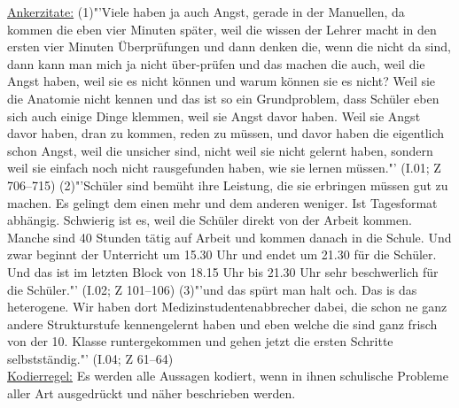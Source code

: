 \underline{Ankerzitate:} (1)"'Viele haben ja auch Angst, gerade in der Manuellen, da kommen die eben vier Minuten später, weil die wissen der Lehrer macht in den ersten vier Minuten Überprüfungen und dann denken die, wenn die nicht da sind, dann kann man mich ja nicht über-prüfen und das machen die auch, weil die Angst haben, weil sie es nicht können und warum können sie es nicht? Weil sie die Anatomie nicht kennen und das ist so ein Grundproblem, dass Schüler eben sich auch einige Dinge klemmen, weil sie Angst davor haben. Weil sie Angst davor haben, dran zu kommen, reden zu müssen, und davor haben die eigentlich schon Angst, weil die unsicher sind, nicht weil sie nicht gelernt haben, sondern weil sie einfach noch nicht rausgefunden haben, wie sie lernen müssen."' (I.01; Z 706--715)
(2)"'Schüler sind bemüht ihre Leistung, die sie erbringen müssen gut zu machen. Es gelingt dem einen mehr und dem anderen weniger. Ist Tagesformat abhängig. Schwierig ist es, weil die Schüler direkt von der Arbeit kommen. Manche sind 40 Stunden tätig auf Arbeit und kommen danach in die Schule. Und zwar beginnt der Unterricht um 15.30 Uhr und endet um 21.30 für die Schüler. Und das ist im letzten Block von 18.15 Uhr bis 21.30 Uhr sehr beschwerlich für die Schüler."' (I.02; Z 101--106) (3)"'und das spürt man halt och. Das is das heterogene. Wir haben dort Medizinstudentenabbrecher dabei, die schon ne ganz andere Strukturstufe kennengelernt haben und eben welche die sind ganz frisch von der 10. Klasse runtergekommen und gehen jetzt die ersten Schritte selbstständig."' (I.04; Z 61--64)\\
\underline{Kodierregel:} Es werden alle Aussagen kodiert, wenn in ihnen schulische Probleme aller Art ausgedrückt und näher beschrieben werden.\\

